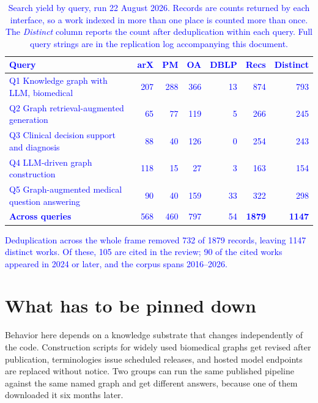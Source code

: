 \documentclass[10pt,a4paper]{article}
\newcommand{\rev}[1]{\textcolor{blue}{#1}}
\newcommand{\rev}[1]{#1}
\begin{document}
\begin{table}[!ht]
\caption{\rev{Search yield by query, run 22 August 2026. Records are counts returned by each
interface, so a work indexed in more than one place is counted more than once. The \emph{Distinct}
column reports the count after deduplication within each query. Full query strings are in the
replication log accompanying this document.}}
\label{tab:ssearch}
\centering
\small
\begin{tabularx}{\columnwidth}{@{}Yrrrrrr@{}}
\toprule
\rev{\textbf{Query}} & \rev{\textbf{arX}} & \rev{\textbf{PM}} & \rev{\textbf{OA}} & \rev{\textbf{DBLP}} & \rev{\textbf{Recs}} & \rev{\textbf{Distinct}} \\
\midrule
\rev{Q1 Knowledge graph with LLM, biomedical}   & \rev{207} & \rev{288} & \rev{366} & \rev{13} & \rev{874} & \rev{793} \\
\rev{Q2 Graph retrieval-augmented generation}   & \rev{65}  & \rev{77}  & \rev{119} & \rev{5}  & \rev{266} & \rev{245} \\
\rev{Q3 Clinical decision support and diagnosis}& \rev{88}  & \rev{40}  & \rev{126} & \rev{0}  & \rev{254} & \rev{243} \\
\rev{Q4 LLM-driven graph construction}          & \rev{118} & \rev{15}  & \rev{27}  & \rev{3}  & \rev{163} & \rev{154} \\
\rev{Q5 Graph-augmented medical question answering} & \rev{90} & \rev{40} & \rev{159} & \rev{33} & \rev{322} & \rev{298} \\
\midrule
\rev{\textbf{Across queries}} & \rev{568} & \rev{460} & \rev{797} & \rev{54} & \rev{\textbf{1879}} & \rev{\textbf{1147}} \\
\bottomrule
\end{tabularx}

\vspace{2pt}
\rev{\footnotesize Deduplication across the whole frame removed 732 of 1879 records, leaving 1147
distinct works. Of these, 105 are cited in the review; 90 of the cited works appeared in 2024 or
later, and the corpus spans 2016--2026.}
\end{table}

\section{What has to be pinned down}
\label{s:why}

Behavior here depends on a knowledge substrate that changes independently of the code. Construction
scripts for widely used biomedical graphs get revised after publication, terminologies issue
scheduled releases, and hosted model endpoints are replaced without notice. Two groups can run the
same published pipeline against the same named graph and get different answers, because one of them
downloaded it six months later.
\end{document}

